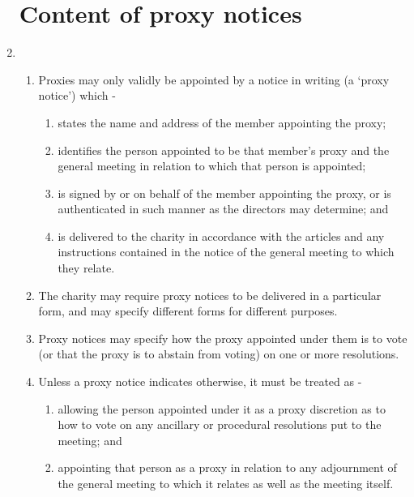 \documentclass{article}
\begin{document}
\begin{enumerate}[label=\arabic*]
    \section{Content of proxy notices}
    \item \begin{enumerate}[label=(\arabic*)]
        \item Proxies may only validly be appointed by a notice in writing (a
        `proxy notice') which -
        \begin{enumerate}[label=(\alph*)]
            \item states the name and address of the member appointing
            the proxy;
            \item identifies the person appointed to be that member's
            proxy and the general meeting in relation to which that
            person is appointed;
            \item is signed by or on behalf of the member appointing the
            proxy, or is authenticated in such manner as the directors
            may determine; and
            \item is delivered to the charity in accordance with the articles
            and any instructions contained in the notice of the general
            meeting to which they relate.
        \end{enumerate}
        \item The charity may require proxy notices to be delivered in
        a particular form, and may specify different forms for
        different purposes.
        \item Proxy notices may specify how the proxy appointed under them
        is to vote (or that the proxy is to abstain from voting) on one or
        more resolutions.
        \item Unless a proxy notice indicates otherwise, it must be treated as -
        \begin{enumerate}[label=(\alph*)]
            \item allowing the person appointed under it as a proxy
            discretion as to how to vote on any ancillary or procedural
            resolutions put to the meeting; and
            \item appointing that person as a proxy in relation to any
            adjournment of the general meeting to which it relates as
            well as the meeting itself.
        \end{enumerate}
    \end{enumerate}
\end{enumerate}
\end{document}
